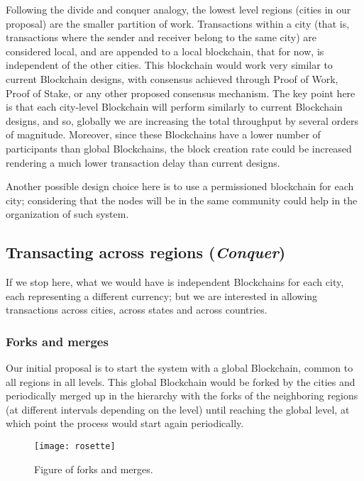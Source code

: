 Following the divide and conquer analogy, the lowest level regions (cities in
our proposal) are the smaller partition of work.  Transactions within a city
(that is, transactions where the sender and receiver belong to the same city)
are considered local, and are appended to a local blockchain, that for now, is
independent of the other cities.  This blockchain would work very similar to
current Blockchain designs, with consensus achieved through Proof of Work,
Proof of Stake, or any other proposed consensus mechanism.  The key point here
is that each city-level Blockchain will perform similarly to current Blockchain
designs, and so, globally we are increasing the total throughput by several
orders of magnitude.  Moreover, since these Blockchains have a lower number of
participants than global Blockchains, the block creation rate could be
increased rendering a much lower transaction delay than current designs.

Another possible design choice here is to use a permissioned blockchain for
each city; considering that the nodes will be in the same community could help
in the organization of such system.

\subsection{Transacting across regions (\textit{Conquer})}

If we stop here, what we would have is independent Blockchains for each city,
each representing a different currency; but we are interested in allowing
transactions across cities, across states and across countries.

\subsubsection{Forks and merges}

Our initial proposal is to start the system with a global Blockchain, common to
all regions in all levels.  This global Blockchain would be forked by the
cities and periodically merged up in the hierarchy with the forks of the
neighboring regions (at different intervals depending on the level) until
reaching the global level, at which point the process would start again
periodically.

\begin{figure}
\texttt{[image: rosette]}
\caption{Figure of forks and merges.}
\end{figure}

